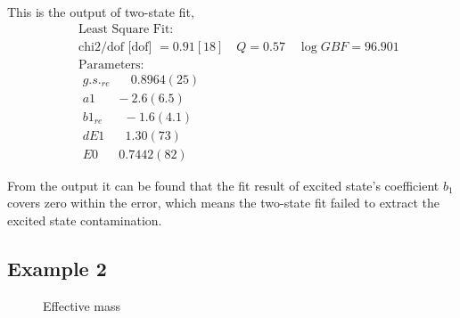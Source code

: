 \documentclass{article}
\begin{document}
This is the output of two-state fit,
\begin{equation}
    \begin{aligned}
    &\text { Least Square Fit: } \\
    &\text { chi2/dof [dof] }=0.91[18] \quad Q=0.57 \quad \log G B F=96.901 \\
    &\text { Parameters: } \\
    &\text { $g.s._{re}$ } \quad 0.8964 (25) \\
    &\text { $a1$ } \quad -2.6 (6.5) \\
    &\text { $b1_{re}$ } \quad -1.6 (4.1) \\
    &\text { $dE1$ } \quad 1.30 (73) \\
    &\text { $E0$ } \quad 0.7442 (82)
    \end{aligned}
\end{equation}

From the output it can be found that the fit result of excited state's coefficient $b_1$ covers zero within the error, which means the two-state fit failed to extract the excited state contamination.






\subsection{Example 2}

\begin{figure}[htbp]
    \centering
    \centering
    \caption{Effective mass}
\end{figure}
\end{document}
